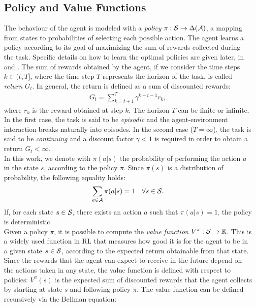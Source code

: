 \subsection{Policy and Value Functions}
The behaviour of the agent is modeled with a \emph{policy} $\pi: \mathcal{S} \mapsto \Delta(\mathcal{A})$, \ie a mapping from states to probabilities of selecting each possible action. The agent learns a policy according to its goal of maximizing the sum of rewards collected during the task. Specific details on how to learn the optimal policies are given later, in  and . The sum of rewards obtained by the agent, if we consider the time steps $k \in (t, T]$, where the time step $T$ represents the horizon of the task, is called \emph{return} $G_t$. In general, the return is defined as a sum of discounted rewards:
\begin{align}G_t = \sum_{k=t+1}^{T} \gamma^{k-t-1} r_k, \end{align} where $r_k$ is the reward obtained at step $k$. The horizon $T$ can be finite or infinite. In the first case, the task is said to be \emph{episodic} and the agent-environment interaction breaks naturally into episodes. In the second case (\ie $T = \infty$), the task is said to be \emph{continuing} and a discount factor $\gamma<1$ is required in order to obtain a return $G_t < \infty$.\\
\newline
In this work, we denote with $\pi(a|s)$ the probability of performing the action $a$ in the state $s$, according to the policy $\pi$. Since $\pi(s)$ is a distribution of probability, the following equality holds:
\begin{align} \sum_{a \in \mathcal{A}} \pi(a|s) = 1 \quad \forall s \in \mathcal{S}. \end{align}
If, for each state $s \in \mathcal{S}$, there exists an action $a$ such that $\pi(a|s) = 1$, the policy is deterministic.\\
\newline
Given a policy $\pi$, it is possible to compute the \emph{value function} $V^{\pi}: \mathcal{S} \rightarrow \mathbb{R}$. This is a widely used function in \ac{RL} that measures how good it is for the agent to be in a given state $s \in \mathcal{S}$, according to the expected return obtainable from that state. Since the rewards that the agent can expect to receive in the future depend on the actions taken in any state, the value function is defined with respect to policies: $V^{\pi}(s)$ is the expected sum of discounted rewards that the agent collects by starting at state $s$ and following policy $\pi$. The value function can be defined recursively via the Bellman equation: 
